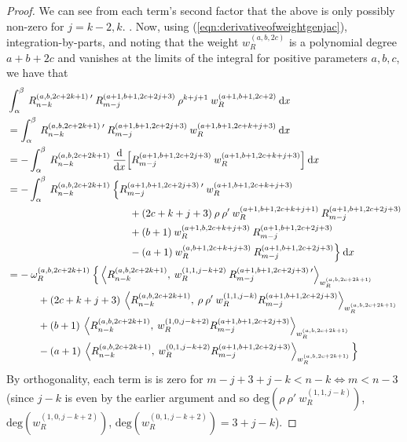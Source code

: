 \documentclass[11pt, oneside]{article}   	%
\newcommand{\bstodo}{\todo[color=pink]}
\newcommand{\ddx}{\frac{\mathrm{d}}{\mathrm{d}x}}
\newcommand{\genjac}{R}
\newcommand{\genjacnmk}{\genjac_{n-k}}
\newcommand{\genjacmmj}{\genjac_{m-j}}
\newcommand{\genjacw}{w_\genjac}
\newcommand{\normgenjac}{\omega_\genjac}
\begin{document}
\begin{proof}
We can see from each term's second factor that the above is only possibly non-zero for $j = k-2, k$. \bstodo{Need to give the working here!!}. Now, using (\ref{eqn:derivativeofweightgenjac}), integration-by-parts, and noting that the weight $\genjacw^{(a,b,2c)}$ is a polynomial degree $a+b+2c$ and vanishes at the limits of the integral for positive parameters $a,b,c$, we have that
\begin{align*}
	&\int_\alpha^\beta \: \genjacnmk^{(a, b, 2c+2k+1) \: \prime} \: \genjacmmj^{(a+1, b+1, 2c+2j+3)} \: \rho^{k+j+1} \: \genjacw^{(a+1, b+1, 2c+2)} \: \D x  \\
	&= \int_\alpha^\beta \: \genjacnmk^{(a, b, 2c+2k+1) \: \prime} \: \genjacmmj^{(a+1, b+1, 2c+2j+3)} \: \genjacw^{(a+1, b+1, 2c+k+j+3)} \: \D x \\
	&= - \int_\alpha^\beta \: \genjacnmk^{(a, b, 2c+2k+1)} \: \ddx \Big[ \genjacmmj^{(a+1, b+1, 2c+2j+3)} \: \genjacw^{(a+1, b+1, 2c+k+j+3)} \Big] \: \D x \\
	&= - \int_\alpha^\beta \: \genjacnmk^{(a, b, 2c+2k+1)} \: \Big\{ \genjacmmj^{(a+1, b+1, 2c+2j+3) \: \prime} \: \genjacw^{(a+1, b+1, 2c+k+j+3)} \\
	&\quad \quad \quad \quad \quad \quad \quad \quad \quad \quad \quad \quad + (2c+k+j+3) \: \rho \: \rho' \:  \genjacw^{(a+1, b+1, 2c+k+j+1)} \: \genjacmmj^{(a+1, b+1, 2c+2j+3)} \\
	&\quad \quad \quad \quad \quad \quad \quad \quad \quad \quad \quad \quad + (b+1) \: \genjacw^{(a+1, b, 2c+k+j+3)} \: \genjacmmj^{(a+1, b+1, 2c+2j+3)} \\
	&\quad \quad \quad \quad \quad \quad \quad \quad \quad \quad \quad \quad - (a+1) \: \genjacw^{(a, b+1, 2c+k+j+3)} \: \genjacmmj^{(a+1, b+1, 2c+2j+3)} \Big\} \: \D x \\
	&= - \: \normgenjac^{(a, b, 2c+2k+1)} \:  \Big\{ \ip<\genjacnmk^{(a, b, 2c+2k+1)}, \: \genjacw^{(1, 1, j-k+2)} \: \genjacmmj^{(a+1, b+1, 2c+2j+3) \: \prime}>_{\genjacw^{(a, b, 2c+2k+1)}} \\
		&\quad \quad \quad + (2c+k+j+3) \: \ip<\genjacnmk^{(a, b, 2c+2k+1)}, \: \rho \: \rho' \: \genjacw^{(1,1, j-k)} \genjacmmj^{(a+1, b+1, 2c+2j+3)} >_{\genjacw^{(a, b, 2c+2k+1)}} \\
		&\quad \quad \quad + (b+1) \: \ip<\genjacnmk^{(a, b, 2c+2k+1)}, \: \genjacw^{(1,0, j-k+2)} \genjacmmj^{(a+1, b+1, 2c+2j+3)} >_{\genjacw^{(a, b, 2c+2k+1)}} \\
		&\quad \quad \quad - (a+1) \: \ip<\genjacnmk^{(a, b, 2c+2k+1)}, \: \genjacw^{(0,1, j-k+2)} \genjacmmj^{(a+1, b+1, 2c+2j+3)} >_{\genjacw^{(a, b, 2c+2k+1)}} \Big\}
\end{align*}
By orthogonality, each term is is zero for $m-j+3+j-k < n-k \iff m < n - 3$ (since $j-k$ is even by the earlier argument and so $\text{deg}(\rho \: \rho' \: \genjacw^{(1,1, j-k)})$,  $\text{deg} (\genjacw^{(1,0, j-k+2)})$, $\text{deg} (\genjacw^{(0,1, j-k+2)}) = 3 + j-k$).


\end{proof}
\end{document}
